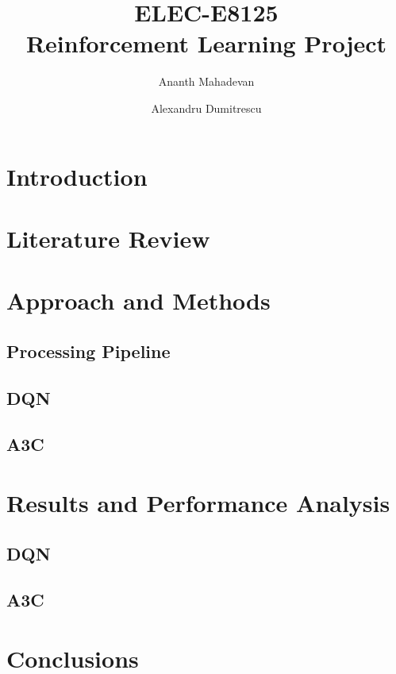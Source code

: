 \documentclass{article}
\title{ELEC-E8125 \\
        Reinforcement Learning Project}
\author{  Ananth Mahadevan\\
\and
Alexandru Dumitrescu\\
}
\date{}
\begin{document}
\maketitle
\clearpage
\tableofcontents
\clearpage

\section{Introduction}
\label{sec:introduction}



\section{Literature Review}
\label{sec:external}


\section{Approach and Methods}
\label{sec:methods}

\subsection{Processing Pipeline}
\subsection{DQN}
\subsection{A3C}


\section{Results and Performance Analysis}
\label{sec:results}

\subsection{DQN}
\subsection{A3C}

\section{Conclusions}
\label{sec:conclusion}

\clearpage
{}

\end{document}
